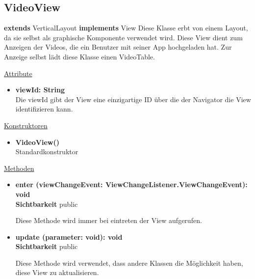 \newpage
\subsection{VideoView}
\textbf{extends}  VerticalLayout \newline
\textbf{implements} View \newline
Diese Klasse erbt von einem Layout, da sie selbst als graphische Komponente verwendet wird. Diese View dient zum Anzeigen der Videos, die ein Benutzer mit seiner App hochgeladen hat. Zur Anzeige selbst lädt diese Klasse einen VideoTable.
\newline

\underline{Attribute}
\begin{itemize}
\itemsep0pt
\item \textbf{viewId: String} \hfill\\ 
Die viewId gibt der View eine einzigartige ID über die der Navigator die View identifizieren kann.

\end{itemize}

\underline{Konstruktoren}
\begin{itemize}
\itemsep0pt
\item \textbf{VideoView()} \hfill\\
Standardkonstruktor
\end{itemize}

\underline{Methoden}
\begin{itemize}
\itemsep0pt
\item \textbf{enter (viewChangeEvent: ViewChangeListener.ViewChangeEvent): void}\hfill\\
\textbf{Sichtbarkeit} public

Diese Methode wird immer bei eintreten der View aufgerufen.

\item \textbf{update (parameter: void): void}\hfill\\
\textbf{Sichtbarkeit} public

Diese Methode wird verwendet, dass andere Klassen die Möglichkeit haben, diese View zu aktualisieren.

\end{itemize}

